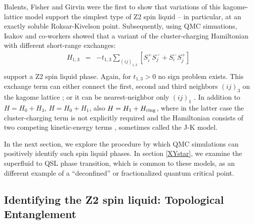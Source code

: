 \documentclass[range]{ar2e}
\begin{document}
Balents, Fisher and Girvin \cite{BFG} were the first to show that variations of this kagome-lattice model support the simplest type of Z2 spin liquid -- in particular, at an exactly soluble Roksar-Kivelson point.  Subsequently, using QMC simuations, Isakov and co-workers showed that a variant of the cluster-charging Hamiltonian with different short-range exchanges: 
\begin{eqnarray}
H_{1,3} &=& -t_{1,3} \sum_{( ij )_{1,3}} [S^{+}_i S^-_j + S^-_i S^{+}_j]  \\
\end{eqnarray}
support a Z2 spin liquid phase.  Again, for $t_{1,3}>0$ no sign problem exists.  This exchange term can either connect the first, second and third neighbors $( ij )_3$ on the kagome lattice \cite{Isakov1,Isakov2}; or it can be nearest-neighbor only $( ij )_1$ \cite{TopoEE}.  
In addition to  $H = H_0 + H_3$, $H = H_0 + H_1$, also $H = H_1 + H_{\rm ring}$, where in the latter case the cluster-charging term is not explicitly required and the Hamiltonian consists of two competing kinetic-energy terms \cite{Long}, sometimes called the J-K model.



In the next section, we explore the procedure by which QMC simulations can positively identify such spin liquid phases.  In section \ref{XYstar}, we examine the superfluid to QSL phase transition, which is common to these models, as an different example of a ``deconfined'' or fractionalized quantum critical point.

\subsection{Identifying the Z2 spin liquid: Topological Entanglement} \label{topoEEsec}
\end{document}
